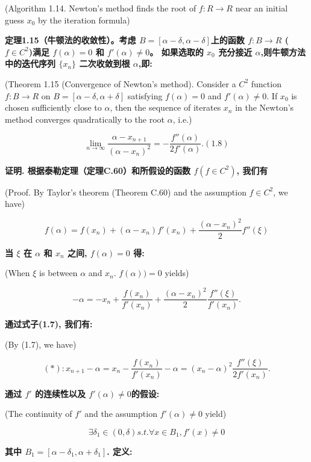 \documentclass{ctexart}
\begin{document}

(Algorithm 1.14. Newton’s method finds the root of $f : R \rightarrow R$ near an initial guess $x_0$ by the iteration formula)

\textbf{定理1.15（牛顿法的收敛性）。考虑 $B=[\alpha - \delta,\alpha - \delta]$上的函数 $f: B \rightarrow R$ ($f \in C^2$)满足 $f(\alpha) = 0$ 和 $f'(\alpha) \ne 0$。 如果选取的 $x_0$ 充分接近 $\alpha$,则牛顿方法中的迭代序列 $\{x_n\}$ 二次收敛到根 $\alpha$,即:}

(Theorem 1.15 (Convergence of Newton’s method). Consider a $C^2$ function $f : B \rightarrow R$ on $B = [\alpha − \delta, \alpha + \delta]$ satisfying $f(\alpha) = 0$ and $f'(\alpha) \ne 0$. If $x_0$ is chosen sufficiently close to $\alpha$, then the sequence of iterates ${x_n}$ in the Newton’s method converges quadratically to the root $\alpha$, i.e.)

\[
\lim_{n \rightarrow \infty}
\frac{\alpha - x_{n+1}}{(\alpha - x_n)^2} = -\frac{f''(\alpha)}{2f'(\alpha)}. (1.8)
\]

\textbf{证明. 根据泰勒定理（定理C.60）和所假设的函数 $f(f \in C^2)$, 我们有}

(Proof. By Taylor’s theorem (Theorem C.60) and the assumption $f \in C^2$, we have)

\[
f(\alpha) = f(x_n) + (\alpha - x_n)f'(x_n) + \frac{(\alpha - x_n)^2}{2}f''(\xi)
\]

\textbf{当 $\xi$ 在 $\alpha$ 和 $x_n$ 之间, $f(\alpha) = 0$ 得:}

(When $\xi$ is between $\alpha$ and $x_n$. $f(\alpha)) = 0$ yields)

\[
-\alpha = -x_n + \frac{f(x_n)}{f'(x_n)} + \frac{(\alpha - x_n)^2}{2} \frac{f''(\xi)}{f'(x_n)}.
\]

\textbf{通过式子(1.7), 我们有:}

(By (1.7), we have)

\[
(*): x_{n+1} - \alpha = x_n - \frac{f(x_n)}{f'(x_n)} - \alpha = (x_n - \alpha)^2\frac{f''(\xi)}{2f'(x_n)}.
\]

\textbf{通过 $f'$ 的连续性以及 $f'(\alpha) \ne 0$的假设:}

(The continuity of $f'$ and the assumption $f'(\alpha) \ne 0$ yield)

\[
\exists \delta _1 \in (0,\delta) s.t. \forall x \in B_1, f'(x) \ne 0
\]

\textbf{其中 $B_1 = [\alpha-\delta _1, \alpha + \delta _1]$. 定义:}
\end{document}
